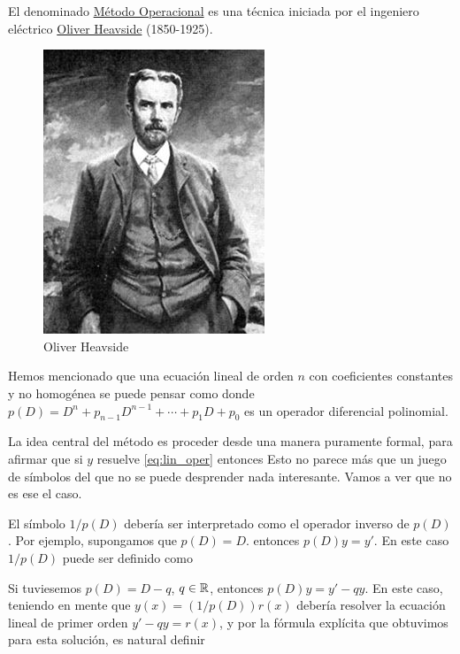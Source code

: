 El denominado \href{http://en.wikipedia.org/wiki/Operational_calculus}{Método Operacional} es una técnica iniciada por el ingeniero eléctrico  \href{http://es.wikipedia.org/wiki/Oliver_Heaviside}{Oliver Heavside} (1850-1925).

\begin{figure}
  \begin{center}
\includegraphics[scale=.8]{imagenes/Heaviside.jpg}
 \end{center}
 \caption{Oliver Heavside}
\end{figure}
Hemos mencionado que una ecuación lineal de orden $n$ con coeficientes constantes y  no homogénea se puede pensar como
donde $p(D)=D^n+p_{n-1}D^{n-1}+\cdots+p_1D+ p_0$ es un operador diferencial polinomial.




La idea central del método es proceder desde una manera puramente formal, para afirmar que si $y$ resuelve
\eqref{eq:lin_oper} entonces
Esto no parece más que un juego de símbolos del que no se puede desprender nada interesante. Vamos a ver que no es ese el caso.

El símbolo $1/p(D)$ debería ser interpretado como el operador inverso de $p(D)$. Por ejemplo, supongamos que $p(D)=D$. entonces $p(D)y=y'$. En este caso $1/p(D)$ puede ser definido como


Si tuviesemos $p(D)=D-q$, $q\in\rr$, entonces $p(D)y=y'-qy$. En este caso, teniendo en mente que $y(x)=(1/p(D))r(x)$ debería resolver la ecuación lineal de primer orden $y'-qy=r(x)$, y por la fórmula explícita que obtuvimos para esta solución, es natural definir

